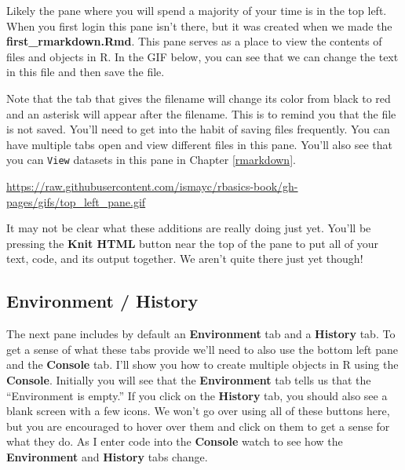 \documentclass[]{tufte-book}
\begin{document}
Likely the pane where you will spend a majority of your time is in the
top left. When you first login this pane isn't there, but it was created
when we made the \textbf{first\_rmarkdown.Rmd}. This pane serves as a
place to view the contents of files and objects in R. In the GIF below,
you can see that we can change the text in this file and then save the
file.

Note that the tab that gives the filename will change its color from
black to red and an asterisk will appear after the filename. This is to
remind you that the file is not saved. You'll need to get into the habit
of saving files frequently. You can have multiple tabs open and view
different files in this pane. You'll also see that you can \texttt{View}
datasets in this pane in Chapter \ref{rmarkdown}.

\vspace{0.1in}

\begin{center}\footnotesize{\url{https://raw.githubusercontent.com/ismayc/rbasics-book/gh-pages/gifs/top_left_pane.gif}}\end{center}

\vspace{0.1in}

It may not be clear what these additions are really doing just yet.
You'll be pressing the \textbf{Knit HTML} button near the top of the
pane to put all of your text, code, and its output together. We aren't
quite there just yet though!

\subsection{Environment / History}\label{environment-history}

The next pane includes by default an \textbf{Environment} tab and a
\textbf{History} tab. To get a sense of what these tabs provide we'll
need to also use the bottom left pane and the \textbf{Console} tab. I'll
show you how to create multiple objects in R using the \textbf{Console}.
Initially you will see that the \textbf{Environment} tab tells us that
the ``Environment is empty.'' If you click on the \textbf{History} tab,
you should also see a blank screen with a few icons. We won't go over
using all of these buttons here, but you are encouraged to hover over
them and click on them to get a sense for what they do. As I enter code
into the \textbf{Console} watch to see how the \textbf{Environment} and
\textbf{History} tabs change.
\end{document}
